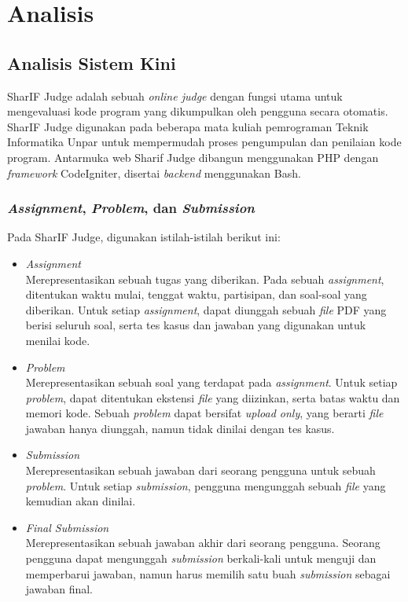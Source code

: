 \chapter{Analisis}
\label{chap:analisis}

\section{Analisis Sistem Kini}
\label{sec:3:analisiskini} 

SharIF Judge adalah sebuah \textit{online judge} dengan fungsi utama untuk mengevaluasi kode program yang dikumpulkan oleh pengguna secara otomatis. SharIF Judge digunakan pada beberapa mata kuliah pemrograman Teknik Informatika Unpar untuk mempermudah proses pengumpulan dan penilaian kode program. Antarmuka web Sharif Judge dibangun menggunakan PHP dengan \textit{framework} CodeIgniter, disertai \textit{backend} menggunakan Bash.

\subsection{\textit{Assignment}, \textit{Problem}, dan \textit{Submission}}
\label{subs:3:assignment}

Pada SharIF Judge, digunakan istilah-istilah berikut ini:

\begin{itemize}
    \item \textit{Assignment} \\ Merepresentasikan sebuah tugas yang diberikan. Pada sebuah \textit{assignment}, ditentukan waktu mulai, tenggat waktu, partisipan, dan soal-soal yang diberikan. Untuk setiap \textit{assignment}, dapat diunggah sebuah \textit{file} PDF yang berisi seluruh soal, serta tes kasus dan jawaban yang digunakan untuk menilai kode.
    \item \textit{Problem} \\ Merepresentasikan sebuah soal yang terdapat pada \textit{assignment}. Untuk setiap \textit{problem}, dapat ditentukan ekstensi \textit{file} yang diizinkan, serta batas waktu dan memori kode. Sebuah \textit{problem} dapat bersifat \textit{upload only}, yang berarti \textit{file} jawaban hanya diunggah, namun tidak dinilai dengan tes kasus.
    \item \textit{Submission} \\ Merepresentasikan sebuah jawaban dari seorang pengguna untuk sebuah \textit{problem}. Untuk setiap \textit{submission}, pengguna mengunggah sebuah \textit{file} yang kemudian akan dinilai.
    \item \textit{Final Submission} \\ Merepresentasikan sebuah jawaban akhir dari seorang pengguna. Seorang pengguna dapat mengunggah \textit{submission} berkali-kali untuk menguji dan memperbarui jawaban, namun harus memilih satu buah \textit{submission} sebagai jawaban final.
\end{itemize}

